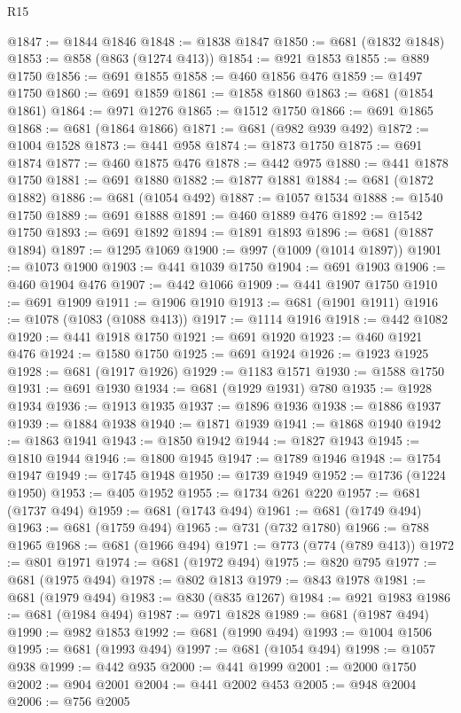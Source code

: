 \begin{lexlean}{R15}
\begin{coremodule}
@1847 := @1844 @1846
@1848 := @1838 @1847
@1850 := @681 (@1832 @1848)
@1853 := @858 (@863 (@1274 @413))
@1854 := @921 @1853
@1855 := @889 @1750
@1856 := @691 @1855
@1858 := @460 @1856 @476
@1859 := @1497 @1750
@1860 := @691 @1859
@1861 := @1858 @1860
@1863 := @681 (@1854 @1861)
@1864 := @971 @1276
@1865 := @1512 @1750
@1866 := @691 @1865
@1868 := @681 (@1864 @1866)
@1871 := @681 (@982 @939 @492)
@1872 := @1004 @1528
@1873 := @441 @958
@1874 := @1873 @1750
@1875 := @691 @1874
@1877 := @460 @1875 @476
@1878 := @442 @975
@1880 := @441 @1878 @1750
@1881 := @691 @1880
@1882 := @1877 @1881
@1884 := @681 (@1872 @1882)
@1886 := @681 (@1054 @492)
@1887 := @1057 @1534
@1888 := @1540 @1750
@1889 := @691 @1888
@1891 := @460 @1889 @476
@1892 := @1542 @1750
@1893 := @691 @1892
@1894 := @1891 @1893
@1896 := @681 (@1887 @1894)
@1897 := @1295 @1069
@1900 := @997 (@1009 (@1014 @1897))
@1901 := @1073 @1900
@1903 := @441 @1039 @1750
@1904 := @691 @1903
@1906 := @460 @1904 @476
@1907 := @442 @1066
@1909 := @441 @1907 @1750
@1910 := @691 @1909
@1911 := @1906 @1910
@1913 := @681 (@1901 @1911)
@1916 := @1078 (@1083 (@1088 @413))
@1917 := @1114 @1916
@1918 := @442 @1082
@1920 := @441 @1918 @1750
@1921 := @691 @1920
@1923 := @460 @1921 @476
@1924 := @1580 @1750
@1925 := @691 @1924
@1926 := @1923 @1925
@1928 := @681 (@1917 @1926)
@1929 := @1183 @1571
@1930 := @1588 @1750
@1931 := @691 @1930
@1934 := @681 (@1929 @1931) @780
@1935 := @1928 @1934
@1936 := @1913 @1935
@1937 := @1896 @1936
@1938 := @1886 @1937
@1939 := @1884 @1938
@1940 := @1871 @1939
@1941 := @1868 @1940
@1942 := @1863 @1941
@1943 := @1850 @1942
@1944 := @1827 @1943
@1945 := @1810 @1944
@1946 := @1800 @1945
@1947 := @1789 @1946
@1948 := @1754 @1947
@1949 := @1745 @1948
@1950 := @1739 @1949
@1952 := @1736 (@1224 @1950)
@1953 := @405 @1952
@1955 := @1734 @261 @220
@1957 := @681 (@1737 @494)
@1959 := @681 (@1743 @494)
@1961 := @681 (@1749 @494)
@1963 := @681 (@1759 @494)
@1965 := @731 (@732 @1780)
@1966 := @788 @1965
@1968 := @681 (@1966 @494)
@1971 := @773 (@774 (@789 @413))
@1972 := @801 @1971
@1974 := @681 (@1972 @494)
@1975 := @820 @795
@1977 := @681 (@1975 @494)
@1978 := @802 @1813
@1979 := @843 @1978
@1981 := @681 (@1979 @494)
@1983 := @830 (@835 @1267)
@1984 := @921 @1983
@1986 := @681 (@1984 @494)
@1987 := @971 @1828
@1989 := @681 (@1987 @494)
@1990 := @982 @1853
@1992 := @681 (@1990 @494)
@1993 := @1004 @1506
@1995 := @681 (@1993 @494)
@1997 := @681 (@1054 @494)
@1998 := @1057 @938
@1999 := @442 @935
@2000 := @441 @1999
@2001 := @2000 @1750
@2002 := @904 @2001
@2004 := @441 @2002 @453
@2005 := @948 @2004
@2006 := @756 @2005

\end{coremodule}
\end{lexlean}
